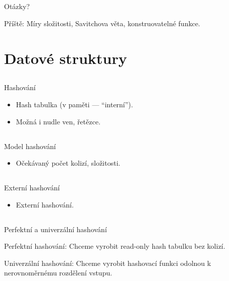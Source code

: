 \documentclass{beamer}
\begin{document}
\subsection{}
\begin{frame}{Otázky?}
\begin{center}
Příště: Míry složitosti, Savitchova věta, konstruovatelné funkce.
\end{center}
\end{frame}

\section{Datové struktury}

\subsection{}
\begin{frame}{Hashování}
\begin{itemize}
\item Hash tabulka (v paměti --- ``interní'').
\item Možná i nudle ven, řetězce.
\end{itemize}
\end{frame}

\subsection{}
\begin{frame}{Model hashování}
\begin{itemize}
\item Očekávaný počet kolizí, složitosti.
\end{itemize}
\end{frame}

\subsection{}
\begin{frame}{Externí hashování}
\begin{itemize}
\item Externí hashování.
\end{itemize}
\end{frame}

\subsection{}
\begin{frame}{Perfektní a univerzální hashování}
\begin{center}
Perfektní hashování: Chceme vyrobit read-only hash tabulku bez kolizí.

Univerzální hashování: Chceme vyrobit hashovací funkci odolnou k nerovnoměrnému rozdělení vstupu.
\end{center}
\end{frame}
\end{document}
